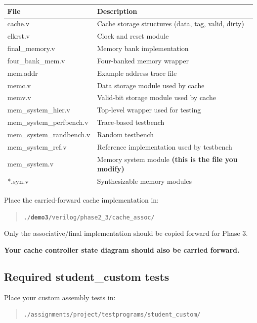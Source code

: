\documentclass[12pt]{article}
\begin{document}
\begin{center}
\begin{tabular}{|l|p{10cm}|}
\hline
\textbf{File} & \textbf{Description} \\
\hline
cache.v & Cache storage structures (data, tag, valid, dirty) \\
clkrst.v & Clock and reset module \\
final\_memory.v & Memory bank implementation \\
four\_bank\_mem.v & Four-banked memory wrapper \\
mem.addr & Example address trace file \\
memc.v & Data storage module used by cache \\
memv.v & Valid-bit storage module used by cache \\
mem\_system\_hier.v & Top-level wrapper used for testing \\
mem\_system\_perfbench.v & Trace-based testbench \\
mem\_system\_randbench.v & Random testbench \\
mem\_system\_ref.v & Reference implementation used by testbench \\
mem\_system.v & Memory system module \textbf{(this is the file you modify)} \\
*.syn.v & Synthesizable memory modules \\
\hline
\end{tabular}
\end{center}

Place the carried-forward cache implementation in:
\begin{quote}
\texttt{./}\textbf{\texttt{demo3}}\texttt{/verilog/phase2\_3/cache\_assoc/}
\end{quote}

Only the associative/final implementation should be copied forward for Phase 3.

\textbf{Your cache controller state diagram should also be carried forward.}

\subsection*{Required student\_custom tests}

Place your custom assembly tests in:

\begin{quote}
\texttt{./assignments/project/testprograms/student\_custom/}
\end{quote}
\end{document}

